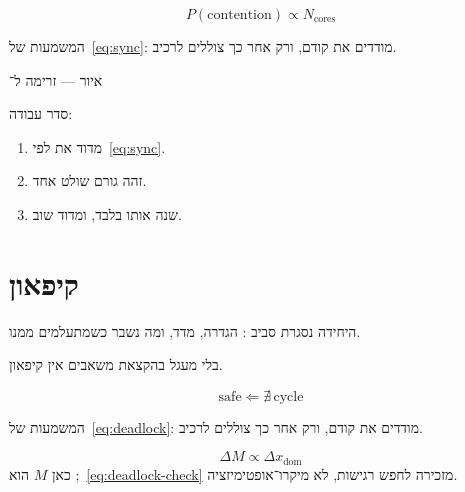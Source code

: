 \begin{equation}
\label{eq:sync}
P(\mathrm{contention}) \propto N_{\mathrm{cores}}
\end{equation}

המשמעות של~\eqref{eq:sync}: מודדים את  קודם, ורק אחר כך צוללים לרכיב.

\begin{tikzpic}
\end{tikzpic}
\begin{center}\small איור — זרימה ל־\end{center}

סדר עבודה:
\begin{enumerate}
\item[(\textbf{א})] מדוד את  לפי~\eqref{eq:sync}.
\item[(\textbf{ב})] זהה גורם שולט אחד.
\item[(\textbf{ג})] שנה אותו בלבד, ומדוד שוב.
\end{enumerate}

\chapter{קיפאון}
\label{ch:deadlock}

היחידה נסגרת סביב : הגדרה, מדד, ומה נשבר כשמתעלמים ממנו.

\begin{thmbox}[frametitle={משפט — קיפאון}]
בלי מעגל בהקצאת משאבים אין קיפאון.
\end{thmbox}

\begin{equation}
\label{eq:deadlock}
\mathrm{safe} \Leftarrow \nexists\,\mathrm{cycle}
\end{equation}

המשמעות של~\eqref{eq:deadlock}: מודדים את  קודם, ורק אחר כך צוללים לרכיב.

\begin{equation}
\label{eq:deadlock-check}
\Delta M \propto \Delta x_{\mathrm{dom}}
\end{equation}
כאן $M$ הוא ;~\eqref{eq:deadlock-check} מזכירה לחפש רגישות, לא מיקרו־אופטימיזציה.

